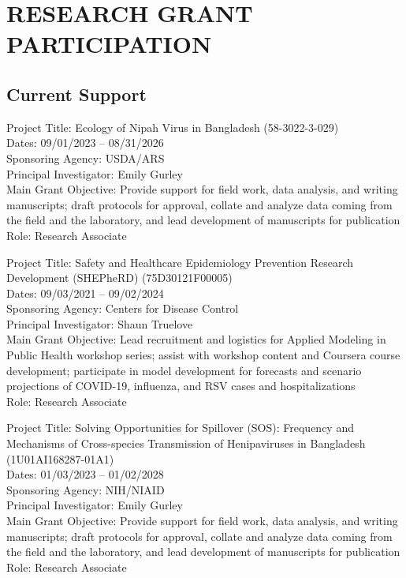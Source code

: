 \documentclass{cv}
\begin{document}

\section*{RESEARCH GRANT PARTICIPATION}

\subsection*{Current Support}

Project Title: Ecology of Nipah Virus in Bangladesh (58-3022-3-029) \\
Dates: 09/01/2023 -- 08/31/2026 \\
Sponsoring Agency: USDA/ARS \\
Principal Investigator: Emily Gurley \\
Main Grant Objective: Provide support for field work, data analysis, and writing manuscripts; draft protocols for approval, collate and analyze data coming from the field and the laboratory, and lead development of manuscripts for publication \\
Role: Research Associate

Project Title: Safety and Healthcare Epidemiology Prevention Research Development (SHEPheRD) (75D30121F00005) \\
Dates: 09/03/2021 -- 09/02/2024 \\
Sponsoring Agency: Centers for Disease Control \\
Principal Investigator: Shaun Truelove \\
Main Grant Objective: Lead recruitment and logistics for Applied Modeling in Public Health workshop series; assist with workshop content and Coursera course development; participate in model development for forecasts and scenario projections of COVID-19, influenza, and RSV cases and hospitalizations \\
Role: Research Associate

Project Title: Solving Opportunities for Spillover (SOS): Frequency and Mechanisms of Cross-species Transmission of Henipaviruses in Bangladesh (1U01AI168287-01A1) \\
Dates: 01/03/2023 -- 01/02/2028 \\
Sponsoring Agency: NIH/NIAID \\
Principal Investigator: Emily Gurley \\
Main Grant Objective: Provide support for field work, data analysis, and writing manuscripts; draft protocols for approval, collate and analyze data coming from the field and the laboratory, and lead development of manuscripts for publication \\
Role: Research Associate
\end{document}
